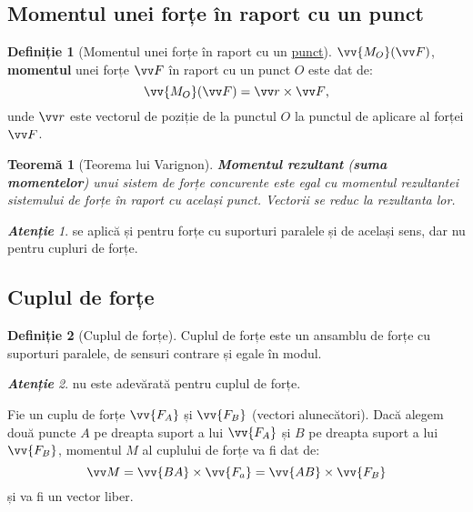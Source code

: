 \documentclass[a4paper]{article}
\theoremstyle{definition}
\newtheorem{definition}{Definiție}[section]
\theoremstyle{plain}%
\newtheorem{theorem}{Teoremă}[section]
\theoremstyle{remark}
\newtheorem*{remark}{\textbf{Atenție}}
\begin{document}
\subsection{Momentul unei forțe în raport cu un punct}

\begin{definition}[Momentul unei forțe în raport cu un \underline{punct}]
	\(\vv{M_O}(\vv F)\), \textbf{momentul} unei forțe \(\vv F\) în raport cu un punct \(O\) este dat de:
	\begin{equation*}
		\vv{M_O}(\vv F) = \vv r \times \vv F \text{,}
	\end{equation*}
	unde \(\vv r\) este vectorul de poziție de la punctul \(O\) la punctul de aplicare al forței \(\vv F\).
\end{definition}

\begin{theorem}[Teorema lui Varignon]\label{varignon}
	\textbf{Momentul rezultant} (\textbf{suma momentelor}) unui sistem de forțe
	concurente este egal cu momentul rezultantei sistemului de forțe în raport
	cu același punct. Vectorii se reduc la rezultanta lor.
\end{theorem}

\begin{remark}
	 se aplică și pentru forțe cu suporturi paralele și de același sens, dar nu pentru cupluri de forțe.
\end{remark}

\subsection{Cuplul de forțe}
\begin{definition}[Cuplul de forțe]
	Cuplul de forțe este un ansamblu de forțe cu suporturi paralele, de sensuri contrare și egale în modul.
\end{definition}

\begin{remark}
	 nu este adevărată pentru cuplul de forțe.
\end{remark}

Fie un cuplu de forțe \(\vv{F_A}\) și \(\vv{F_B}\) (vectori alunecători). Dacă alegem două puncte \(A\) pe dreapta suport a lui \(\vv{F_A}\) și \(B\) pe dreapta suport a lui \(\vv{F_B}\), momentul \(M\) al cuplului de forțe va fi dat de:
\begin{equation*}
	\vv M = \vv{BA} \times \vv{F_a} = \vv{AB} \times \vv{F_B}
\end{equation*}
și va fi un vector liber.
\end{document}
